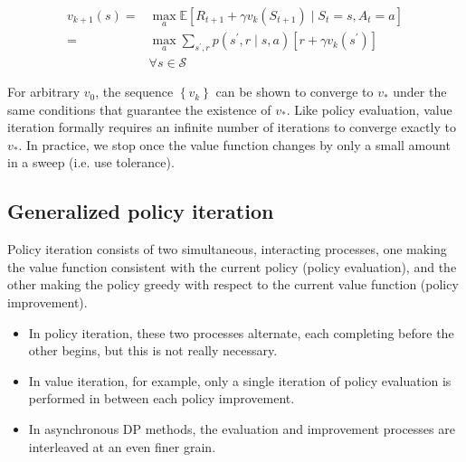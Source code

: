 \documentclass[11pt]{article}
\theoremstyle{plain} %
\theoremstyle{remark}
\begin{document}
$$
  \begin{aligned}
    v_{k+1}(s)= & \max _{a} \mathbb{E}\left[R_{t+1}+\gamma v_{k}\left(S_{t+1}\right) \mid S_{t}=s, A_{t}=a\right]                        \\
    =           & \max _{a} \sum_{s^{\prime}, r} p\left(s^{\prime}, r \mid s, a\right)\left[r+\gamma v_{k}\left(s^{\prime}\right)\right] \\
                & \forall s \in \mathcal{S}
  \end{aligned}
$$

For arbitrary $v_{0}$, the sequence $\left\{v_{k}\right\}$ can be shown to
converge to $v_{*}$ under the same conditions that guarantee the
existence of $v_{*}$. Like policy evaluation, value iteration formally
requires an infinite number of iterations to converge exactly to
$v_{*}$. In practice, we stop once the value function changes by only a
small amount in a sweep (i.e. use tolerance).


\subsection{Generalized policy iteration}
 Policy iteration consists of two simultaneous, interacting processes,
        one making the value function consistent with the current policy (policy
        evaluation), and the other making the policy greedy with respect to the
        current value function (policy improvement).
\begin{itemize} 
  \item In policy iteration, these two processes alternate, each completing
        before the other begins, but this is not really necessary.

  \item In value iteration, for example, only a single iteration of policy
        evaluation is performed in between each policy improvement.

  \item In asynchronous DP methods, the evaluation and improvement processes
        are interleaved at an even finer grain.
\end{itemize}
 
\end{document}
